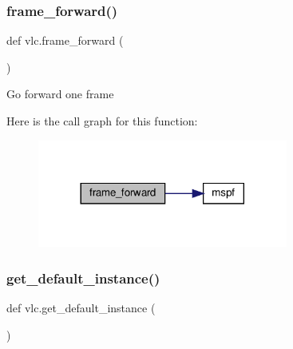\subsubsection{\texorpdfstring{frame\+\_\+forward()}{frame\_forward()}}
{\footnotesize\ttfamily def vlc.\+frame\+\_\+forward (\begin{DoxyParamCaption}{ }\end{DoxyParamCaption})}

\begin{DoxyVerb}Go forward one frame\end{DoxyVerb}
 Here is the call graph for this function\+:
\nopagebreak
\begin{figure}[H]
\begin{center}
\leavevmode
\includegraphics[width=233pt]{namespacevlc_a8ca4660553489d4345fe15e1ff1267a6_cgraph}
\end{center}
\end{figure}
\mbox{\label{namespacevlc_a3e00cfbbf5aa7ede16e3877359d8212e}} 
\subsubsection{\texorpdfstring{get\+\_\+default\+\_\+instance()}{get\_default\_instance()}}
{\footnotesize\ttfamily def vlc.\+get\+\_\+default\+\_\+instance (\begin{DoxyParamCaption}{ }\end{DoxyParamCaption})}

